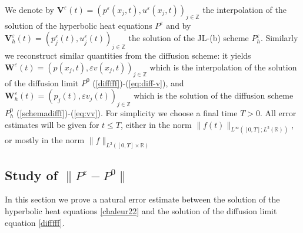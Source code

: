 \documentclass[a4paper,french,english,10pt]{article}
\newcommand\eps{\varepsilon}
\newcommand\V{\mathbf{V}}
\newcommand\W{\mathbf{W}}
\begin{document}
We denote by $\V^{\eps}(t)=\left(p^{\eps}(x_j,t),
u^{\eps}(x_j,t)\right)_{j\in \mathbb Z}$ the interpolation of the 
solution of the hyperbolic heat equations $P^\eps$ and by
$\V^{\eps}_h(t)=
\left(p_j^{\eps}(t), u_j^{\eps}(t)   \right)_{j\in \mathbb Z}$ the
solution of the JL-(b) scheme $P_h^\eps$. Similarly  we  reconstruct
similar quantities from the diffusion scheme: it yields 
$\W^\eps(t)=\left(p(x_j,t),\varepsilon v(x_j,t)\right)_{j\in \mathbb Z}$ 
which is the interpolation of the 
solution of the diffusion limit
$P^0$ (\ref{difffff})-(\ref{eq:diff-v}),
 and  $\W_h^\eps(t)=\left( p_j(t),  
\varepsilon v_j(t)   \right)_{j\in \mathbb Z}$ which is
the
solution of the diffusion scheme $P_h^0$ (\ref{schemadifff})-(\ref{eq:vv}). 
For simplicity we choose a final time $T>0$.
All  error estimates will be given for 
$t\leq T$, either
in the norm
$\|f(t)\|_{L^\infty([0,T];L^2(\mathbb{R}))}$, or mostly in the norm
$\|f\|_{L^2([0,T]\times \mathbb{R})}$



\subsection{Study of $\|P^\varepsilon-P^0  \|$}

In this section we prove a natural error estimate \cite{cveps}
between the solution of the
hyperbolic heat equations \eqref{chaleur22} and the solution of the diffusion
limit equation \eqref{difffff}. 
\end{document}
